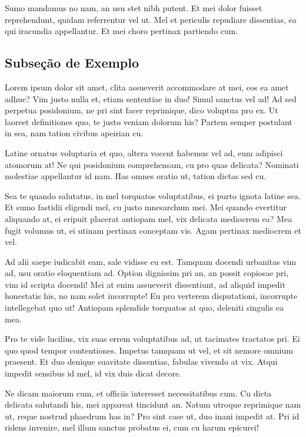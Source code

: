 \documentclass[
	12pt,				%
	openright,			%
	oneside,			%
	a4paper,			%
	english,			%
	french,				%
	spanish,			%
	brazil,				%
	]{abntex2}
\begin{document}
Sumo mandamus no nam, an usu stet nibh putent. Et mei dolor fuisset reprehendunt, quidam referrentur vel ut. Mel et periculis repudiare dissentias, ea qui iracundia appellantur. Et mei choro pertinax partiendo cum.

\subsection{Subseção de Exemplo}

Lorem ipsum dolor sit amet, clita assueverit accommodare at mei, eos ea amet adhuc? Vim justo nulla et, etiam sententiae in duo! Simul sanctus vel ad! Ad sed perpetua posidonium, ne pri sint facer reprimique, dico voluptua pro ex. Ut laoreet definitiones quo, te justo veniam dolorum his? Partem semper postulant in sea, nam tation civibus apeirian cu.

Latine ornatus voluptaria et quo, altera vocent habemus vel ad, eum adipisci atomorum at! Ne qui posidonium comprehensam, cu pro quas delicata? Nominati molestiae appellantur id nam. Has omnes oratio ut, tation dictas sed cu.

Sea te quando salutatus, in mel torquatos voluptatibus, ei purto ignota latine sea. Et sumo fastidii eligendi mel, cu justo mnesarchum mei. Mei quando evertitur aliquando at, ei eripuit placerat antiopam mel, vix delicata mediocrem ea? Mea fugit volumus ut, ei utinam pertinax conceptam vis. Agam pertinax mediocrem et vel.

Ad alii saepe iudicabit eam, sale vidisse eu est. Tamquam docendi urbanitas vim ad, usu oratio eloquentiam ad. Option dignissim pri an, an possit copiosae pri, vim id scripta docendi! Mei at enim assueverit dissentiunt, ad aliquid impedit honestatis his, no nam solet incorrupte! Eu pro verterem disputationi, incorrupte intellegebat quo ut! Antiopam splendide torquatos at quo, deleniti singulis ea mea.

Pro te vide lucilius, vix suas errem voluptatibus ad, ut tacimates tractatos pri. Ei quo quod tempor contentiones. Impetus tamquam ut vel, et sit nemore omnium praesent. Et duo denique suavitate dissentias, fabulas vivendo at vix. Atqui impedit sensibus id mel, id vix duis dicat decore.

Ne dicam maiorum cum, et officiis interesset necessitatibus cum. Cu dicta delicata salutandi his, mei appareat tincidunt an. Natum utroque reprimique nam ut, reque nostrud phaedrum has in? Pro sint case ut, duo inani impedit at. Pri id ridens invenire, mel illum sanctus probatus ei, cum cu harum epicurei!
\end{document}
